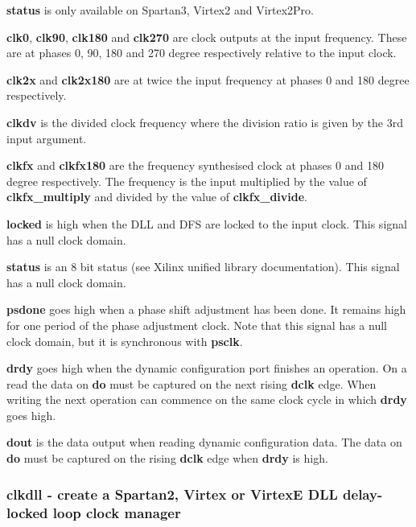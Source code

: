                 {\bf status} is only available on Spartan3, Virtex2 and Virtex2Pro.
                
                {\bf clk0}, {\bf clk90}, {\bf clk180} and {\bf clk270} are clock
                outputs at the input frequency. These are at phases 0, 90, 180 and 270
                degree respectively relative to the input clock.

                {\bf clk2x} and {\bf clk2x180} are at twice the input frequency
                at phases 0 and 180 degree respectively.

                {\bf clkdv} is the divided clock frequency where the division ratio
                is given by the 3rd input argument.

                {\bf clkfx} and {\bf clkfx180} are the frequency synthesised clock
                at phases 0 and 180 degree respectively. The frequency is the input
                multiplied by the value of {\bf clkfx\_multiply} and divided by the value
                of {\bf clkfx\_divide}.

                {\bf locked} is high when the DLL and DFS are locked to the input
                clock. This signal has a null clock domain.

                {\bf status} is an 8 bit status (see Xilinx unified library
                documentation). This signal has a null clock domain.

                {\bf psdone} goes high when a phase shift adjustment has been done.
                It remains high for one period of the phase adjustment clock. Note
                that this signal has a null clock domain, but it is synchronous
                with {\bf psclk}.

                {\bf drdy} goes high when the dynamic configuration port finishes
                an operation. On a read the data on {\bf do} must be captured on
                the next rising {\bf dclk} edge. When writing the next operation
                can commence on the same clock cycle in which {\bf drdy} goes high.

                {\bf dout} is the data output when reading dynamic configuration data.
                The data on {\bf do} must be captured on
                the rising {\bf dclk} edge when {\bf drdy} is high.



        \subsubsection{clkdll - create a Spartan2, Virtex or VirtexE DLL delay-locked loop clock manager}\label{sec:lpclkdll}
            
